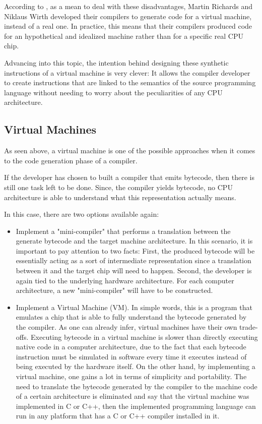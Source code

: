 According to \cite{nystrom2021crafting}, as a mean to deal with these disadvantages, Martin Richards and Niklaus Wirth developed their compilers to generate code for a virtual machine, instead of a real one. In practice, this means that their compilers produced code for an hypothetical and idealized machine rather than for a specific real CPU chip.

Advancing into this topic, the intention behind designing these synthetic instructions of a virtual machine is very clever: It allows the compiler developer to create instructions that are linked to the semantics of the source programming language without needing to worry about the peculiarities of any CPU architecture.


\subsection{Virtual Machines}
As seen above, a virtual machine is one of the possible approaches when it comes to the code generation phase of a compiler.

If the developer has chosen to built a compiler that emits bytecode, then there is still one task left to be done. Since, the compiler yields bytecode, no CPU architecture is able to understand what this representation actually means.

In this case, there are two options available again:
\begin{itemize}
    \item Implement a "mini-compiler" that performs a translation between the generate bytecode and the target machine architecture. In this scenario, it is important to pay attention to two facts: First, the produced bytecode will be essentially acting as a sort of intermediate representation since a translation between it and the target chip will need to happen. Second, the developer is again tied to the underlying hardware architecture. For each computer architecture, a new "mini-compiler" will have to be constructed.
    
    \item Implement a Virtual Machine (VM). In simple words, this is a program that emulates a chip that is able to fully understand the bytecode generated by the compiler. As one can already infer, virtual machines have their own trade-offs. Executing bytecode in a virtual machine is slower than directly executing native code in a computer architecture, due to the fact that each bytecode instruction must be simulated in software every time it executes instead of being executed by the hardware itself. On the other hand, by implementing a virtual machine, one gains a lot in terms of simplicity and portability. The need to translate the bytecode generated by the compiler to the machine code of a certain architecture is eliminated and say that the virtual machine was implemented in C or C++, then the implemented programming language can run in any platform that has a C or C++ compiler installed in it.
\end{itemize}


